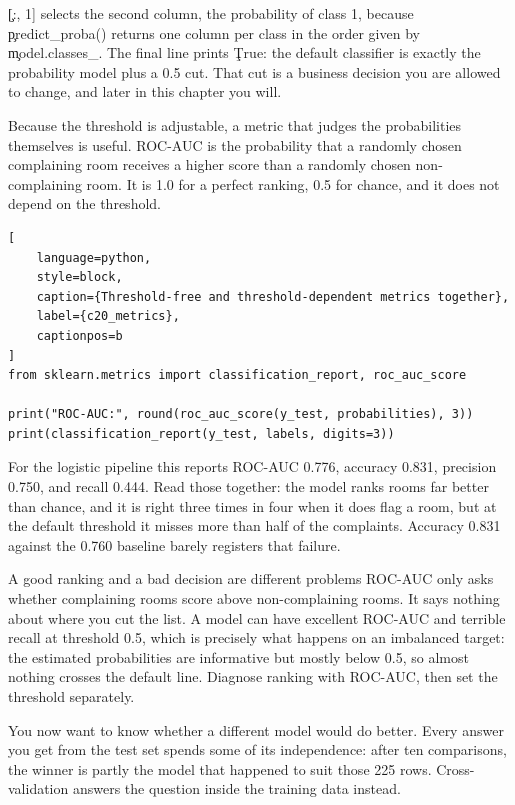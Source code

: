 \c{[:, 1]} selects the second column, the probability of class 1, because
\c{predict_proba()} returns one column per class in the order given by
\c{model.classes_}. The final line prints \c{True}: the default classifier is
exactly the probability model plus a 0.5 cut. That cut is a business decision
you are allowed to change, and later in this chapter you will.


Because the threshold is adjustable, a metric that judges the probabilities
themselves is useful. ROC-AUC is the probability that a randomly chosen
complaining room receives a higher score than a randomly chosen
non-complaining room. It is 1.0 for a perfect ranking, 0.5 for chance, and it
does not depend on the threshold.

\begin{lstlisting}[
    language=python,
    style=block,
    caption={Threshold-free and threshold-dependent metrics together},
    label={c20_metrics},
    captionpos=b
]
from sklearn.metrics import classification_report, roc_auc_score

print("ROC-AUC:", round(roc_auc_score(y_test, probabilities), 3))
print(classification_report(y_test, labels, digits=3))
\end{lstlisting}

For the logistic pipeline this reports ROC-AUC 0.776, accuracy 0.831, precision
0.750, and recall 0.444. Read those together: the model ranks rooms far better
than chance, and it is right three times in four when it does flag a room, but
at the default threshold it misses more than half of the complaints. Accuracy
0.831 against the 0.760 baseline barely registers that failure.

\begin{ExplainBox}{A good ranking and a bad decision are different problems}
ROC-AUC only asks whether complaining rooms score above non-complaining rooms.
It says nothing about where you cut the list. A model can have excellent ROC-AUC
and terrible recall at threshold 0.5, which is precisely what happens on an
imbalanced target: the estimated probabilities are informative but mostly below
0.5, so almost nothing crosses the default line. Diagnose ranking with ROC-AUC,
then set the threshold separately.
\end{ExplainBox}


You now want to know whether a different model would do better. Every answer you
get from the test set spends some of its independence: after ten comparisons, the
winner is partly the model that happened to suit those 225 rows.
Cross-validation answers the question inside the training data instead.

